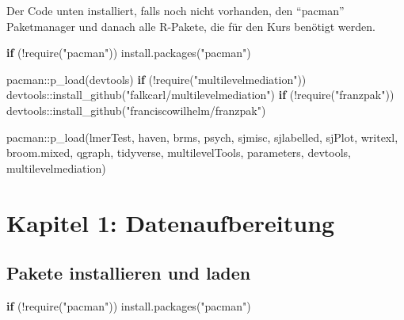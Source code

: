 \documentclass[
  letterpaper,
  DIV=11,
  numbers=noendperiod]{scrreprt}
\newenvironment{Shaded}{\begin{snugshade}}{\end{snugshade}}
\newcommand{\ControlFlowTok}[1]{\textcolor[rgb]{0.00,0.23,0.31}{\textbf{#1}}}
\newcommand{\FunctionTok}[1]{\textcolor[rgb]{0.28,0.35,0.67}{#1}}
\newcommand{\NormalTok}[1]{\textcolor[rgb]{0.00,0.23,0.31}{#1}}
\newcommand{\SpecialCharTok}[1]{\textcolor[rgb]{0.37,0.37,0.37}{#1}}
\newcommand{\StringTok}[1]{\textcolor[rgb]{0.13,0.47,0.30}{#1}}
\begin{document}
Der Code unten installiert, falls noch nicht vorhanden, den ``pacman''
Paketmanager und danach alle R-Pakete, die für den Kurs benötigt werden.

\begin{Shaded}
\begin{Highlighting}[]
\ControlFlowTok{if}\NormalTok{ (}\SpecialCharTok{!}\FunctionTok{require}\NormalTok{(}\StringTok{"pacman"}\NormalTok{)) }\FunctionTok{install.packages}\NormalTok{(}\StringTok{"pacman"}\NormalTok{)}

\NormalTok{pacman}\SpecialCharTok{::}\FunctionTok{p\_load}\NormalTok{(devtools)}
\ControlFlowTok{if}\NormalTok{ (}\SpecialCharTok{!}\FunctionTok{require}\NormalTok{(}\StringTok{"multilevelmediation"}\NormalTok{)) devtools}\SpecialCharTok{::}\FunctionTok{install\_github}\NormalTok{(}\StringTok{"falkcarl/multilevelmediation"}\NormalTok{)}
\ControlFlowTok{if}\NormalTok{ (}\SpecialCharTok{!}\FunctionTok{require}\NormalTok{(}\StringTok{"franzpak"}\NormalTok{)) devtools}\SpecialCharTok{::}\FunctionTok{install\_github}\NormalTok{(}\StringTok{"franciscowilhelm/franzpak"}\NormalTok{)}

\NormalTok{pacman}\SpecialCharTok{::}\FunctionTok{p\_load}\NormalTok{(lmerTest, haven, brms, psych,}
\NormalTok{               sjmisc, sjlabelled, sjPlot, writexl, broom.mixed, qgraph,}
\NormalTok{               tidyverse, multilevelTools, parameters, devtools,}
\NormalTok{               multilevelmediation)}
\end{Highlighting}
\end{Shaded}


\chapter{Kapitel 1:
Datenaufbereitung}\label{kapitel-1-datenaufbereitung}

\section{Pakete installieren und
laden}\label{pakete-installieren-und-laden}

\begin{Shaded}
\begin{Highlighting}[]
\ControlFlowTok{if}\NormalTok{ (}\SpecialCharTok{!}\FunctionTok{require}\NormalTok{(}\StringTok{"pacman"}\NormalTok{)) }\FunctionTok{install.packages}\NormalTok{(}\StringTok{"pacman"}\NormalTok{)}
\end{Highlighting}
\end{Shaded}
\end{document}
